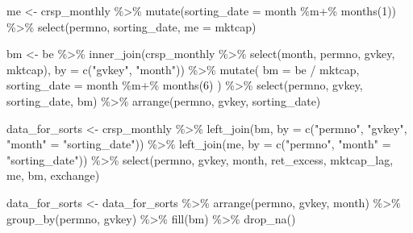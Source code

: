\documentclass[
]{krantz}
\newenvironment{Shaded}{\begin{snugshade}}{\end{snugshade}}
\newcommand{\AttributeTok}[1]{\textcolor[rgb]{0.61,0.61,0.61}{#1}}
\newcommand{\DecValTok}[1]{\textcolor[rgb]{0.06,0.06,0.06}{#1}}
\newcommand{\FunctionTok}[1]{\textcolor[rgb]{0,0,0}{#1}}
\newcommand{\NormalTok}[1]{#1}
\newcommand{\OtherTok}[1]{\textcolor[rgb]{0.37,0.37,0.37}{#1}}
\newcommand{\SpecialCharTok}[1]{\textcolor[rgb]{0,0,0}{#1}}
\newcommand{\StringTok}[1]{\textcolor[rgb]{0.5,0.5,0.5}{#1}}
\begin{document}
\begin{Shaded}
\begin{Highlighting}[]
\NormalTok{me }\OtherTok{\textless{}{-}}\NormalTok{ crsp\_monthly }\SpecialCharTok{\%\textgreater{}\%}
  \FunctionTok{mutate}\NormalTok{(}\AttributeTok{sorting\_date =}\NormalTok{ month }\SpecialCharTok{\%m+\%} \FunctionTok{months}\NormalTok{(}\DecValTok{1}\NormalTok{)) }\SpecialCharTok{\%\textgreater{}\%}
  \FunctionTok{select}\NormalTok{(permno, sorting\_date, }\AttributeTok{me =}\NormalTok{ mktcap)}

\NormalTok{bm }\OtherTok{\textless{}{-}}\NormalTok{ be }\SpecialCharTok{\%\textgreater{}\%}
  \FunctionTok{inner\_join}\NormalTok{(crsp\_monthly }\SpecialCharTok{\%\textgreater{}\%}
    \FunctionTok{select}\NormalTok{(month, permno, gvkey, mktcap), }\AttributeTok{by =} \FunctionTok{c}\NormalTok{(}\StringTok{"gvkey"}\NormalTok{, }\StringTok{"month"}\NormalTok{)) }\SpecialCharTok{\%\textgreater{}\%}
  \FunctionTok{mutate}\NormalTok{(}
    \AttributeTok{bm =}\NormalTok{ be }\SpecialCharTok{/}\NormalTok{ mktcap,}
    \AttributeTok{sorting\_date =}\NormalTok{ month }\SpecialCharTok{\%m+\%} \FunctionTok{months}\NormalTok{(}\DecValTok{6}\NormalTok{)}
\NormalTok{  ) }\SpecialCharTok{\%\textgreater{}\%}
  \FunctionTok{select}\NormalTok{(permno, gvkey, sorting\_date, bm) }\SpecialCharTok{\%\textgreater{}\%}
  \FunctionTok{arrange}\NormalTok{(permno, gvkey, sorting\_date)}

\NormalTok{data\_for\_sorts }\OtherTok{\textless{}{-}}\NormalTok{ crsp\_monthly }\SpecialCharTok{\%\textgreater{}\%}
  \FunctionTok{left\_join}\NormalTok{(bm, }\AttributeTok{by =} \FunctionTok{c}\NormalTok{(}\StringTok{"permno"}\NormalTok{, }\StringTok{"gvkey"}\NormalTok{, }\StringTok{"month"} \OtherTok{=} \StringTok{"sorting\_date"}\NormalTok{)) }\SpecialCharTok{\%\textgreater{}\%}
  \FunctionTok{left\_join}\NormalTok{(me, }\AttributeTok{by =} \FunctionTok{c}\NormalTok{(}\StringTok{"permno"}\NormalTok{, }\StringTok{"month"} \OtherTok{=} \StringTok{"sorting\_date"}\NormalTok{)) }\SpecialCharTok{\%\textgreater{}\%}
  \FunctionTok{select}\NormalTok{(permno, gvkey, month, ret\_excess, mktcap\_lag, me, bm, exchange)}

\NormalTok{data\_for\_sorts }\OtherTok{\textless{}{-}}\NormalTok{ data\_for\_sorts }\SpecialCharTok{\%\textgreater{}\%}
  \FunctionTok{arrange}\NormalTok{(permno, gvkey, month) }\SpecialCharTok{\%\textgreater{}\%}
  \FunctionTok{group\_by}\NormalTok{(permno, gvkey) }\SpecialCharTok{\%\textgreater{}\%}
  \FunctionTok{fill}\NormalTok{(bm) }\SpecialCharTok{\%\textgreater{}\%}
  \FunctionTok{drop\_na}\NormalTok{()}
\end{Highlighting}
\end{Shaded}
\end{document}
